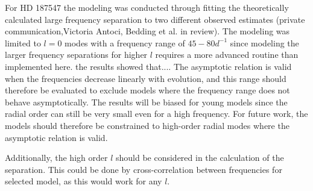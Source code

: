 For HD 187547 the modeling was conducted through fitting the theoretically calculated large frequency separation to two different observed estimates \citet{antoci2011excitation} (private communication,Victoria Antoci, Bedding et al. in review). The modeling was limited to $l=0$ modes with a frequency range of $45-80 d^{-1}$ since modeling the larger frequency separations for higher $l$ requires a more advanced routine than implemented here. 
the results showed that....  
The asymptotic relation is valid when the frequencies decrease linearly with evolution, and this range should therefore be evaluated to exclude models where the frequency range does not behave asymptotically. The results will be biased for young models since the radial order can still be very small even for a high frequency. For future work, the models should therefore be constrained to high-order radial modes where the asymptotic relation is valid. 

Additionally, the high order $l$ should be considered in the calculation of the separation. This could be done by cross-correlation between frequencies for selected model, as this would work for any $l$. 


